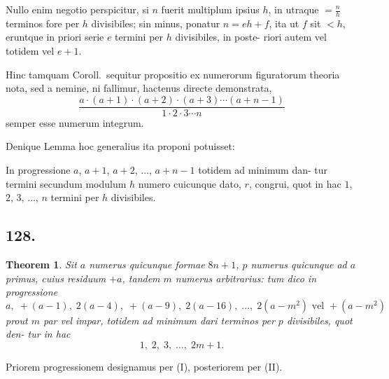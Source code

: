 \documentclass[12pt,a4paper]{article}
\theoremstyle{plain}
\newtheorem{theorem}{Theorem}[section]
\theoremstyle{definition}
\theoremstyle{remark}
\begin{document}
Nullo enim negotio perspicitur, si $n$ fuerit multiplum ipsius $h$, in utraque
$= \frac{n}{h}$ terminos fore per $h$ divisibiles; sin minus, ponatur $n = eh + f$,
ita ut $f$ sit $< h$, eruntque in priori serie $e$ termini per $h$ divisibiles, in poste-
riori autem vel totidem vel $e+1$.

Hinc tamquam Coroll.\ sequitur propositio ex numerorum figuratorum theoria
nota, sed a nemine, ni fallimur, hactenus directe demonstrata,
\[
\frac{a \cdot (a+1) \cdot (a+2) \cdot (a+3) \cdots (a+n-1)}{1 \cdot 2 \cdot 3 \cdots n}
\]
semper esse numerum integrum.

Denique Lemma hoc generalius ita proponi potuisset:

In progressione $a$, $a+1$, $a+2$, $\ldots$, $a+n-1$ totidem ad minimum dan-
tur termini secundum modulum $h$ numero cuicunque dato, $r$, congrui, quot in
hac $1$, $2$, $3$, $\ldots$, $n$ termini per $h$ divisibiles.


\subsection*{128.}

\begin{theorem}
Sit $a$ numerus quicunque formae $8n+1$, $p$ numerus quicunque
ad $a$ primus, cuius residuum $+a$, tandem $m$ numerus arbitrarius: tum dico in
progressione
\[
a,\; +(a-1),\; 2(a-4),\; +(a-9),\; 2(a-16),\; \ldots,\; 2(a-m^2) \text{ vel } +(a-m^2)
\]
prout $m$ par vel impar, totidem ad minimum dari terminos per $p$ divisibiles, quot den-
tur in hac
\[
1,\; 2,\; 3,\; \ldots,\; 2m+1.
\]
\end{theorem}

Priorem progressionem designamus per (I), posteriorem per (II).
\end{document}

